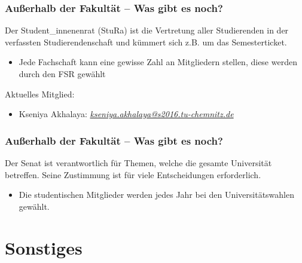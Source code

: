 \documentclass[10pt]{beamer}
\begin{document}
\begin{frame}
\frametitle{Außerhalb der Fakultät -- Was gibt es noch?}
\begin{block}{\vphantom{X}}
	Der Student\_innenenrat (StuRa) ist die Vertretung aller Studierenden in der verfassten Studierendenschaft und kümmert sich z.B. um das Semesterticket.
\end{block}
\begin{itemize}
	\item Jede Fachschaft kann eine gewisse Zahl an Mitgliedern stellen, diese werden durch den FSR gewählt
\end{itemize}
Aktuelles Mitglied:
\begin{itemize}
	\item Kseniya Akhalaya: \textit{\href{mailto:kseniya.akhalaya@s2016.tu-chemnitz.de}{kseniya.akhalaya@s2016.tu-chemnitz.de}}
\end{itemize}
\end{frame}

\begin{frame}
\frametitle{Außerhalb der Fakultät -- Was gibt es noch?}
\begin{block}{\vphantom{X}}
	Der Senat ist verantwortlich für Themen, welche die gesamte Universität betreffen. Seine Zustimmung ist für viele Entscheidungen erforderlich.
\end{block}
\begin{itemize}
	\item Die studentischen Mitglieder werden jedes Jahr bei den Universitätswahlen gewählt.
\end{itemize}
\end{frame}

\section{Sonstiges}
\end{document}
